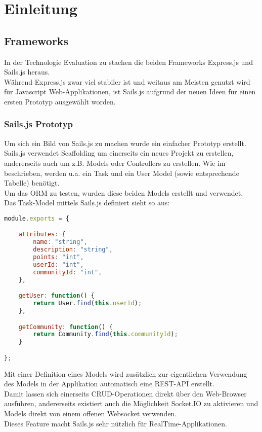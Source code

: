 \section{Einleitung}

\subsection*{Frameworks}
In der Technologie Evaluation zu  stachen die beiden Frameworks Express.js \cite{Expressjs}
und Sails.js \cite{sails} heraus.\\
Während Express.js zwar viel stabiler ist und weitaus am Meisten genutzt wird für Javascript Web-Applikationen, ist Sails.js aufgrund der neuen
Ideen für einen ersten Prototyp ausgewählt worden.

\subsubsection*{Sails.js Prototyp}
Um sich ein Bild von Sails.js zu machen wurde ein einfacher Prototyp \cite{SailsPrototyp} erstellt.\\[1mm]

Sails.js verwendet \gls{Scaffolding} um einerseits ein neues Projekt zu erstellen, andererseits auch um z.B. Models oder Controllers zu erstellen.
Wie im  beschrieben, werden u.a. ein Task und ein User Model (sowie entsprechende Tabelle) benötigt.\\
Um das \gls{ORM} zu testen, wurden diese beiden Models erstellt und verwendet.\\
Das Task-Model mittels Sails.js definiert sieht so aus:\\

\begin{lstlisting}[language=JavaScript, caption=Task Model in Sails.js]
module.exports = {

	attributes: {
		name: "string",
		description: "string",
		points: "int",
		userId: "int",
		communityId: "int",
	},

	getUser: function() {
		return User.find(this.userId);
	},

	getCommunity: function() {
		return Community.find(this.communityId);
	}

};
\end{lstlisting}

Mit einer Definition eines Models wird zusätzlich zur eigentlichen Verwendung des Models in der Applikation automatisch eine \gls{REST}-API erstellt.\\
Damit lassen sich einerseits CRUD-Operationen direkt über den Web-Browser ausführen, andererseits existiert auch die Möglichkeit Socket.IO \cite{SocketIO} zu aktivieren und Models direkt von einem offenen \gls{Websocket} verwenden.\\
Dieses Feature macht Sails.js sehr nützlich für \gls{RealTime}-Applikationen.\\[1mm]

